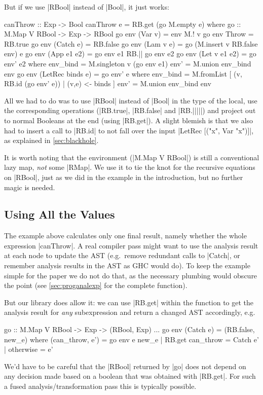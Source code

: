 \documentclass[manuscript,screen,acmsmall,nonacm]{acmart}
\begin{document}
But if we use |RBool| instead of |Bool|, it just works:
\restorecolumns
\begin{code}
canThrow :: Exp -> Bool
canThrow e = RB.get (go M.empty e)
  where
    go :: M.Map V RBool -> Exp -> RBool
    go env (Var v)          = env M.! v
    go env Throw            = RB.true
    go env (Catch e)        = RB.false
    go env (Lam v e)        = go (M.insert v RB.false env) e
    go env (App e1 e2)      = go env e1 RB.|| go env e2
    go env (Let v e1 e2)    = go env' e2
      where
        env_bind  = M.singleton v (go env e1)
        env'      = M.union env_bind env
    go env (LetRec binds e) = go env' e
      where
        env_bind  = M.fromList [ (v, RB.id (go env' e)) | (v,e) <- binds ]
        env'      = M.union env_bind env
\end{code}
All we had to do was to use |RBool| instead of |Bool| in the type of the local, use the corresponding operations (|RB.true|, |RB.false| and |RB.|||||) and  project out to normal Booleans at the end (using |RB.get|). A slight blemish is that we also had to insert a call to |RB.id| to not fall over the input |LetRec [("x", Var "x")]|, as explained in \cref{sec:blackhole}.

It is worth noting that the environment (|M.Map V RBool|) is still a conventional lazy map, \emph{not} some |RMap|. We use it to tie the knot for the recursive equations on |RBool|, just as we did in the example in the introduction, but no further magic is needed.

\subsection{Using All the Values}\label{sec:all-values}

The example above calculates only one final result, namely whether the whole expression |canThrow|. A real compiler pass might want to use the analysis result at each node to update the AST (e.g.\ remove redundant calls to |Catch|, or remember analysis results in the AST as GHC would do). To keep the example simple for the paper we do not do that, as the necessary plumbing would obscure the point (see \cref{sec:proganalexp} for the complete function).

But our library does allow it: we can use |RB.get| within the function to get the analysis result for \emph{any} subexpression and return a changed AST accordingly, e.g.
\restorecolumns
\begin{code}
    go :: M.Map V RBool -> Exp -> (RBool, Exp)
    ...
    go env (Catch e)        = (RB.false, new_e)
      where
        (can_throw, e') = go env e
        new_e  |  RB.get can_throw  = Catch e'
               |  otherwise         = e'
\end{code}
We'd have to be careful that the |RBool| returned by |go| does not depend on any decision made based on a boolean that was obtained with |RB.get|. For such a fused analysis/transformation pass this is typically possible.
\end{document}
